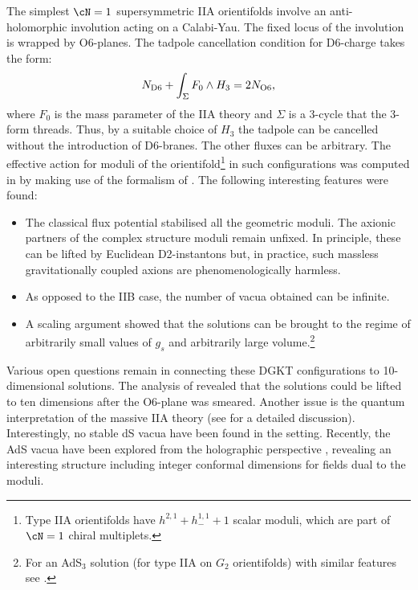 The simplest $\cN = 1$ supersymmetric IIA orientifolds involve an anti-holomorphic involution acting on a Calabi-Yau. The fixed locus of the involution is wrapped by O6-planes. The tadpole cancellation condition for D6-charge takes the form:
$$
    N_{\rm D6}  + \int_{\Sigma} F_0 \wedge H_3 = 2 N_{\rm O6}, 
$$
where $F_0$ is the mass parameter of the IIA theory and $\Sigma$ is a 3-cycle that the 3-form threads. Thus, by a suitable choice of $H_3$ the tadpole can be cancelled without the introduction of D6-branes. The other fluxes can be arbitrary. The effective action for moduli of the orientifold\footnote{
Type IIA orientifolds have $h^{2,1} + h^{1,1}_{-} +1$  scalar moduli, which are part of $\cN=1$ chiral multiplets.} 
in such configurations was computed in \cite{DeWolfe:2005uu} by making use of the formalism of \cite{Grimm:2004ua}. The following interesting features were found:
\begin{itemize}

\item The classical flux potential stabilised all the geometric moduli. The axionic partners of the complex structure moduli remain unfixed. In principle, these can be lifted by Euclidean D2-instantons but, in practice, such massless gravitationally coupled axions are phenomenologically harmless.

\item As opposed to the IIB case, the number of vacua obtained can be infinite.

\item A scaling argument showed that the solutions can be brought to the regime of arbitrarily small values of $g_s$ and arbitrarily 
large volume.\footnote{For an AdS$_3$ solution (for type IIA on $G_2$ orientifolds) with similar features see \cite{Farakos:2020phe}.}

\end{itemize}

 Various open questions remain  in connecting these DGKT configurations to 10-dimensional solutions. The analysis of  \cite{Acharya:2006ne} revealed that the solutions could be lifted to ten dimensions after the O6-plane was smeared. Another issue is the quantum interpretation of the massive IIA theory (see \cite{McOrist:2012yc} for a detailed discussion). Interestingly, no stable dS vacua have been found \cite{Caviezel:2008tf, Flauger:2008ad, Danielsson:2009ff, Caviezel:2009tu, Danielsson:2010bc, Danielsson:2011au, Andriot:2018ept} in the setting. Recently, the AdS vacua have been explored from the holographic perspective  \cite{Conlon:2021cjk, Apers:2022tfm}, revealing an interesting structure including integer conformal dimensions for fields dual to the moduli.
 
